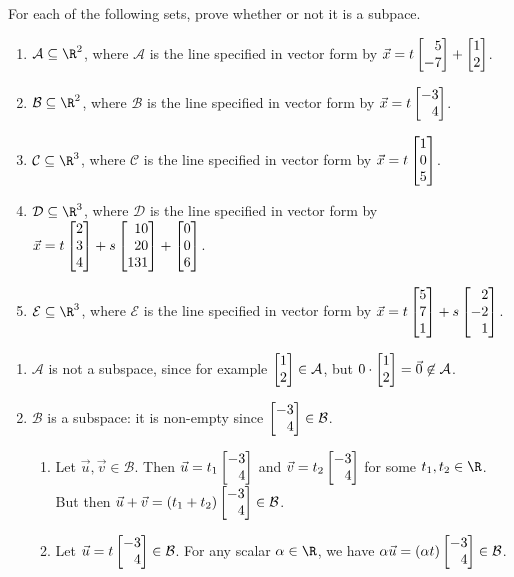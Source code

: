 \begin{exercises}
\begin{problist}
		\prob For each of the following sets, prove whether or not it is a subpace.
		\begin{enumerate}
			\item $\mathcal A \subseteq \R^2$, where $\mathcal A$ is the  line specified in vector form by
			$\vec x = t\mat{5\\-7}+\mat{1\\2}$.
			\item $\mathcal B \subseteq \R^2$, where $\mathcal B$ is  the line specified  in vector form by
			$\vec x = t\mat{-3\\4}$.
			\item $\mathcal C \subseteq \R^3$, where $\mathcal C$ is  the line specified  in vector form by
			$\vec x = t\mat{1\\0\\5}$.
			\item $\mathcal D \subseteq \R^3$, where $\mathcal D$ is  the line specified  in vector form by
			$\vec x = t\mat{2\\3\\4}+s\mat{10\\20\\131}+\mat{0\\0\\6}$.
			\item $\mathcal E \subseteq \R^3$, where $\mathcal E$ is  the line specified  in vector form by
			$\vec x = t\mat{5\\7\\1}+s\mat{2\\-2\\1}$.
		\end{enumerate}
		\begin{solution}
			\begin{enumerate}
				\item $\mathcal A$ is not a subspace, since for example $\mat{1\\2}\in\mathcal A$, 
					but $0\cdot\mat{1\\2}=\vec 0\not\in\mathcal A$.

				\item $\mathcal B$ is a subspace: it is non-empty since $\mat{-3\\4}\in\mathcal B$. 
				\begin{enumerate}
					\item Let $\vec u,\vec v\in \mathcal B$. Then $\vec u=t_1\mat{-3\\4}$ and $\vec v=t_2\mat{-3\\4}$ 
						for some $t_1,t_2\in\R$. But then $\vec u+\vec v=(t_1+t_2)\mat{-3\\4}\in \mathcal B$.
					\item Let $\vec u=t\mat{-3\\4}\in\mathcal B$. For any scalar $\alpha\in\R$, we have
						$\alpha\vec u=(\alpha t)\mat{-3\\4}\in\mathcal B$.
				\end{enumerate}


\end{enumerate}
\end{solution}
\end{problist}
\end{exercises}
